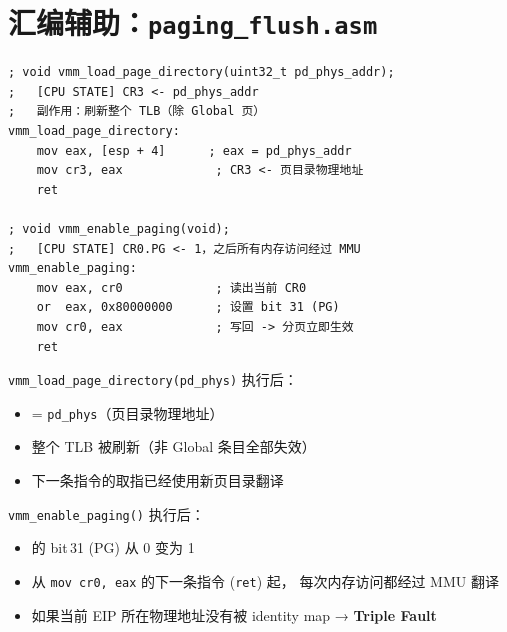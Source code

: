 \section{汇编辅助：\texttt{paging\_flush.asm}}

\begin{lstlisting}[style=nasmstyle]
; void vmm_load_page_directory(uint32_t pd_phys_addr);
;   [CPU STATE] CR3 <- pd_phys_addr
;   副作用：刷新整个 TLB（除 Global 页）
vmm_load_page_directory:
    mov eax, [esp + 4]      ; eax = pd_phys_addr
    mov cr3, eax             ; CR3 <- 页目录物理地址
    ret

; void vmm_enable_paging(void);
;   [CPU STATE] CR0.PG <- 1，之后所有内存访问经过 MMU
vmm_enable_paging:
    mov eax, cr0             ; 读出当前 CR0
    or  eax, 0x80000000      ; 设置 bit 31 (PG)
    mov cr0, eax             ; 写回 -> 分页立即生效
    ret
\end{lstlisting}

\begin{cpustate}
\texttt{vmm\_load\_page\_directory(pd\_phys)} 执行后：
\begin{itemize}
  \item {} = \texttt{pd\_phys}（页目录物理地址）
  \item 整个 TLB 被刷新（非 Global 条目全部失效）
  \item 下一条指令的取指已经使用新页目录翻译
\end{itemize}

\texttt{vmm\_enable\_paging()} 执行后：
\begin{itemize}
  \item {} 的 bit\,31 (PG) 从 0 变为 1
  \item 从 \texttt{mov cr0, eax} 的下一条指令 (\texttt{ret}) 起，
        每次内存访问都经过 MMU 翻译
  \item 如果当前 EIP 所在物理地址没有被 identity map → \textbf{Triple Fault}
\end{itemize}
\end{cpustate}


